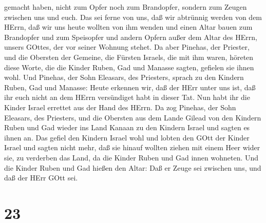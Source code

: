 gemacht haben, nicht zum Opfer noch zum Brandopfer, sondern zum Zeugen
zwischen uns und euch.  Das sei ferne von uns, daß wir
abtrünnig werden von dem HErrn, daß wir uns heute wollten von ihm wenden
und einen Altar bauen zum Brandopfer und zum Speisopfer und andern
Opfern außer dem Altar des HErrn, unsers GOttes, der vor seiner Wohnung
stehet.  Da aber Pinehas, der Priester, und die Obersten
der Gemeine, die Fürsten Israels, die mit ihm waren, höreten diese
Worte, die die Kinder Ruben, Gad und Manasse sagten, gefielen sie ihnen
wohl.  Und Pinehas, der Sohn Eleasars, des Priesters,
sprach zu den Kindern Ruben, Gad und Manasse: Heute erkennen wir, daß
der HErr unter uns ist, daß ihr euch nicht an dem HErrn versündiget habt
in dieser Tat. Nun habt ihr die Kinder Israel errettet aus der Hand des
HErrn.  Da zog Pinehas, der Sohn Eleasars, des Priesters,
und die Obersten aus dem Lande Gilead von den Kindern Ruben und Gad
wieder ins Land Kanaan zu den Kindern Israel und sagten es ihnen an.
 Das gefiel den Kindern Israel wohl und lobten den GOtt der
Kinder Israel und sagten nicht mehr, daß sie hinauf wollten ziehen mit
einem Heer wider sie, zu verderben das Land, da die Kinder Ruben und Gad
innen wohneten.  Und die Kinder Ruben und Gad hießen den
Altar: Daß er Zeuge sei zwischen uns, und daß der HErr GOtt sei.

\hypertarget{section-22}{%
\section{23}\label{section-22}}

